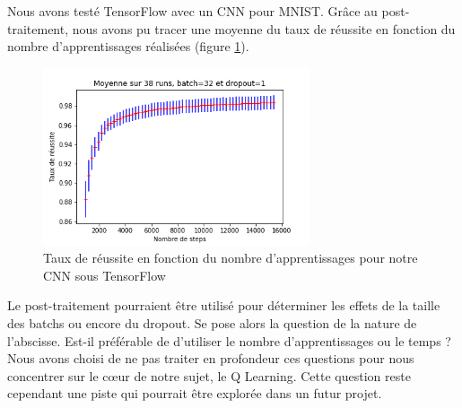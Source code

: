 Nous avons testé TensorFlow avec un CNN pour MNIST. Grâce au post-traitement, nous avons pu tracer une moyenne du taux de réussite en fonction du nombre d'apprentissages réalisées (figure \ref{fig:tb_post_traitement}).

\begin{figure}[h]
 \centering
 \includegraphics[width=0.7\textwidth]{img/tb_post_traitement.png}
 \caption{Taux de réussite en fonction du nombre d'apprentissages pour notre CNN sous TensorFlow}
 \label{fig:tb_post_traitement}
\end{figure}

Le post-traitement pourraient être utilisé pour déterminer les effets de la taille des batchs ou encore du dropout. Se pose alors la question de la nature de l’abscisse. Est-il préférable de d'utiliser le nombre d'apprentissages ou le temps ?
Nous avons choisi de ne pas traiter en profondeur ces questions pour nous concentrer sur le c\oe ur de notre sujet, le Q Learning. Cette question reste cependant une piste qui pourrait être explorée dans un futur projet.

